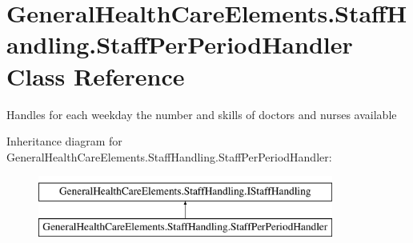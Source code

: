 \hypertarget{class_general_health_care_elements_1_1_staff_handling_1_1_staff_per_period_handler}{}\section{General\+Health\+Care\+Elements.\+Staff\+Handling.\+Staff\+Per\+Period\+Handler Class Reference}
\label{class_general_health_care_elements_1_1_staff_handling_1_1_staff_per_period_handler}


Handles for each weekday the number and skills of doctors and nurses available  


Inheritance diagram for General\+Health\+Care\+Elements.\+Staff\+Handling.\+Staff\+Per\+Period\+Handler\+:\begin{figure}[H]
\begin{center}
\leavevmode
\includegraphics[height=2.000000cm]{class_general_health_care_elements_1_1_staff_handling_1_1_staff_per_period_handler}
\end{center}
\end{figure}
